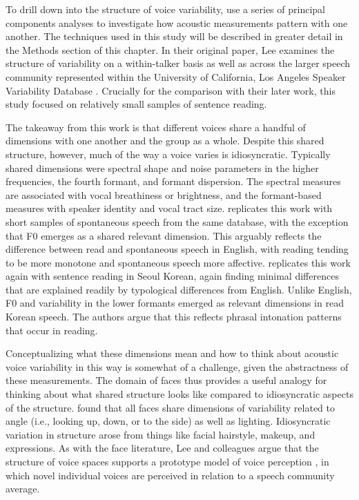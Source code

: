 To drill down into the structure of voice variability, \citet{lee_2019_acoustic} use a series of principal components analyses to investigate how acoustic measurements pattern with one another. The techniques used in this study will be described in greater detail in the Methods section of this chapter. In their original paper, Lee examines the structure of variability on a within-talker basis as well as across the larger speech community represented within the University of California, Los Angeles Speaker Variability Database \citep{keating_2019_database}. Crucially for the comparison with their later work, this study focused on relatively small samples of sentence reading. 

The takeaway from this work is that different voices share a handful of dimensions with one another and the group as a whole. Despite this shared structure, however, much of the way a voice varies is idiosyncratic. Typically shared dimensions were spectral shape and noise parameters in the higher frequencies, the fourth formant, and formant dispersion. The spectral measures are associated with vocal breathiness or brightness, and the formant-based measures with speaker identity and vocal tract size. \citet{lee_2019_spontaneous} replicates this work with short samples of spontaneous speech from the same database, with the exception that F0 emerges as a shared relevant dimension. This arguably reflects the difference between read and spontaneous speech in English, with reading tending to be more monotone and spontaneous speech more affective. \citet{lee_2020_language} replicates this work again with sentence reading in Seoul Korean, again finding minimal differences that are explained readily by typological differences from English. Unlike English, F0 and variability in the lower formants emerged as relevant dimensions in read Korean speech. The authors argue that this reflects phrasal intonation patterns that occur in reading. 

Conceptualizing what these dimensions mean and how to think about acoustic voice variability in this way is somewhat of a challenge, given the abstractness of these measurements. The domain of faces thus provides a useful analogy for thinking about what shared structure looks like compared to idiosyncratic aspects of the structure. \citet{burton_2016_faces} found that all faces share dimensions of variability related to angle (i.e., looking up, down, or to the side) as well as lighting. Idiosyncratic variation in structure arose from things like facial hairstyle, makeup, and expressions. As with the face literature, Lee and colleagues argue that the structure of voice spaces supports a prototype model of voice perception \citep{lavner_2001_prototype}, in which novel individual voices are perceived in relation to a speech community average. %

